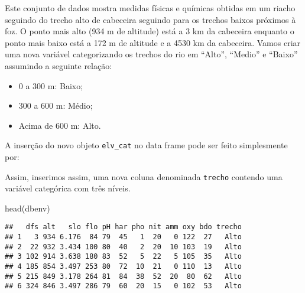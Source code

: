\documentclass[
]{book}
\newenvironment{Shaded}{\begin{snugshade}}{\end{snugshade}}
\newcommand{\AttributeTok}[1]{\textcolor[rgb]{0.77,0.63,0.00}{#1}}
\newcommand{\DecValTok}[1]{\textcolor[rgb]{0.00,0.00,0.81}{#1}}
\newcommand{\FunctionTok}[1]{\textcolor[rgb]{0.00,0.00,0.00}{#1}}
\newcommand{\NormalTok}[1]{#1}
\newcommand{\OtherTok}[1]{\textcolor[rgb]{0.56,0.35,0.01}{#1}}
\newcommand{\SpecialCharTok}[1]{\textcolor[rgb]{0.00,0.00,0.00}{#1}}
\newcommand{\StringTok}[1]{\textcolor[rgb]{0.31,0.60,0.02}{#1}}
\providecommand{\tightlist}{%
  \setlength{\itemsep}{0pt}\setlength{\parskip}{0pt}}
\begin{document}
Este conjunto de dados mostra medidas físicas e químicas obtidas em um riacho seguindo do trecho alto de cabeceira seguindo para os trechos baixos próximos à foz. O ponto mais alto (934 m de altitude) está a 3 km da cabeceira enquanto o ponto mais baixo está a 172 m de altitude e a 4530 km da cabeceira. Vamos criar uma nova variável categorizando os trechos do rio em ``Alto'', ``Medio'' e ``Baixo'' assumindo a seguinte relação:

\begin{itemize}
\tightlist
\item
  0 a 300 m: Baixo;
\item
  300 a 600 m: Médio;
\item
  Acima de 600 m: Alto.
\end{itemize}

\begin{Shaded}
\end{Shaded}

A inserção do novo objeto \texttt{elv\_cat} no data frame pode ser feito simplesmente por:

\begin{Shaded}
\end{Shaded}

Assim, inserimos assim, uma nova coluna denominada \texttt{trecho} contendo uma variável categórica com três níveis.

\begin{Shaded}
\begin{Highlighting}[]
\FunctionTok{head}\NormalTok{(dbenv)}
\end{Highlighting}
\end{Shaded}

\begin{verbatim}
##   dfs alt   slo flo pH har pho nit amm oxy bdo trecho
## 1   3 934 6.176  84 79  45   1  20   0 122  27   Alto
## 2  22 932 3.434 100 80  40   2  20  10 103  19   Alto
## 3 102 914 3.638 180 83  52   5  22   5 105  35   Alto
## 4 185 854 3.497 253 80  72  10  21   0 110  13   Alto
## 5 215 849 3.178 264 81  84  38  52  20  80  62   Alto
## 6 324 846 3.497 286 79  60  20  15   0 102  53   Alto
\end{verbatim}
\end{document}
